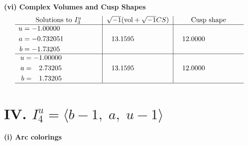 \documentclass[1p]{elsarticle_modified}
\theoremstyle{definition}
\newcommand{\I}{\sqrt{-1}}
\begin{document}
\newpage\flushleft \textbf{(vi) Complex Volumes and Cusp Shapes}
$$\begin{array}{c|c|c}  
\text{Solutions to }I^u_{3}& \I (\text{vol} + \sqrt{-1}CS) & \text{Cusp shape}\\
 \hline 
\begin{aligned}
u &= -1.00000\phantom{ +0.000000I} \\
a &= -0.732051\phantom{ +0.000000I} \\
b &= -1.73205\phantom{ +0.000000I}\end{aligned}
 & \phantom{-}13.1595\phantom{ +0.000000I} & \phantom{-}12.0000\phantom{ +0.000000I} \\ \hline\begin{aligned}
u &= -1.00000\phantom{ +0.000000I} \\
a &= \phantom{-}2.73205\phantom{ +0.000000I} \\
b &= \phantom{-}1.73205\phantom{ +0.000000I}\end{aligned}
 & \phantom{-}13.1595\phantom{ +0.000000I} & \phantom{-}12.0000\phantom{ +0.000000I}\\
 \hline 
 \end{array}$$\newpage\newpage\renewcommand{\arraystretch}{1}
\centering \section*{IV. $I^u_{4}= \langle b-1,\;a,\;u-1 \rangle$}
\flushleft \textbf{(i) Arc colorings}\\
\end{document}
